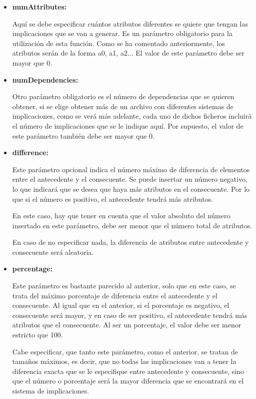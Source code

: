     \begin{itemize}
        \item \textbf{numAttributes:}

        Aqu\'i se debe especificar cu\'antos atributos diferentes se quiere que tengan las implicaciones que se van a generar. Es un 
        par\'ametro obligatorio para la utilizaci\'on de esta funci\'on. Como se ha comentado anteriormente, los atributos ser\'an de la 
        forma a0, a1, a2... El valor de este par\'ametro debe ser mayor que 0.


        \item \textbf{numDependencies:}

        Otro par\'ametro obligatorio es el n\'umero de dependencias que se quieren obtener, si se elige obtener m\'as de un archivo 
        con diferentes sistemas de implicaciones, como se ver\'a m\'as adelante, cada uno de dichos ficheros incluir\'a el n\'umero 
        de implicaciones que se le indique aqu\'i. Por supuesto, el valor de este par\'ametro tambi\'en debe ser mayor que 0.


        \item \textbf{difference:}

        Este par\'ametro opcional indica el n\'umero m\'aximo de diferencia de elementos entre el antecedente y el consecuente. Se puede 
        insertar un n\'umero negativo, lo que indicar\'a que se desea que haya m\'as atributos en el consecuente. Por lo que si el n\'umero 
        es positivo, el antecedente tendr\'a m\'as atributos.

        En este caso, hay que tener en cuenta que el valor absoluto del n\'umero insertado en este par\'ametro, debe ser menor 
        que el n\'umero total de atributos.

        En caso de no especificar nada, la diferencia de atributos entre antecedente y consecuente ser\'a aleatoria.


        \item \textbf{percentage:}

        Este par\'ametro es bastante parecido al anterior, solo que en este caso, se trata del m\'aximo porcentaje de diferencia entre 
        el antecedente y el consecuente. Al igual que en el anterior, si el porcentaje es negativo, el consecuente ser\'a mayor, y en caso de 
        ser positivo, el antecedente tendr\'a m\'as atributos que el consecuente. Al ser un porcentaje, el valor debe ser menor estricto que 
        100.

        Cabe especificar, que tanto este par\'ametro, como el anterior, se tratan de tama\~nos m\'aximos, es decir, que no todas las implicaciones 
        van a tener la diferencia exacta que se le especifique entre antecedente y consecuente, sino que el n\'umero o porcentaje ser\'a la 
        mayor diferencia que se encontrar\'a en el sistema de implicaciones.



\end{itemize}
